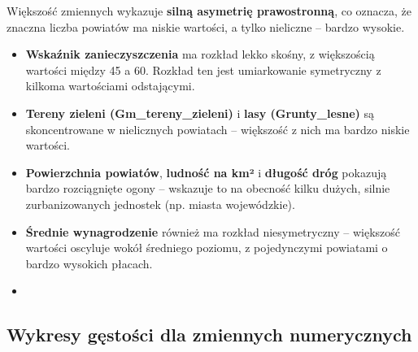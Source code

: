 \documentclass[
  11pt,
]{article}
\begin{document}
Większość zmiennych wykazuje \textbf{silną asymetrię prawostronną}, co
oznacza, że znaczna liczba powiatów ma niskie wartości, a tylko
nieliczne -- bardzo wysokie.

\begin{itemize}
\item
  \textbf{Wskaźnik zanieczyszczenia} ma rozkład lekko skośny, z
  większością wartości między 45 a 60. Rozkład ten jest umiarkowanie
  symetryczny z kilkoma wartościami odstającymi.
\item
  \textbf{Tereny zieleni (Gm\_tereny\_zieleni)} i \textbf{lasy
  (Grunty\_lesne)} są skoncentrowane w nielicznych powiatach --
  większość z nich ma bardzo niskie wartości.
\item
  \textbf{Powierzchnia powiatów}, \textbf{ludność na km²} i
  \textbf{długość dróg} pokazują bardzo rozciągnięte ogony -- wskazuje
  to na obecność kilku dużych, silnie zurbanizowanych jednostek (np.
  miasta wojewódzkie).
\item
  \textbf{Średnie wynagrodzenie} również ma rozkład niesymetryczny --
  większość wartości oscyluje wokół średniego poziomu, z pojedynczymi
  powiatami o bardzo wysokich płacach.
\item
\end{itemize}

\subsection{Wykresy gęstości dla zmiennych
numerycznych}\label{wykresy-gux119stoux15bci-dla-zmiennych-numerycznych}
\end{document}
